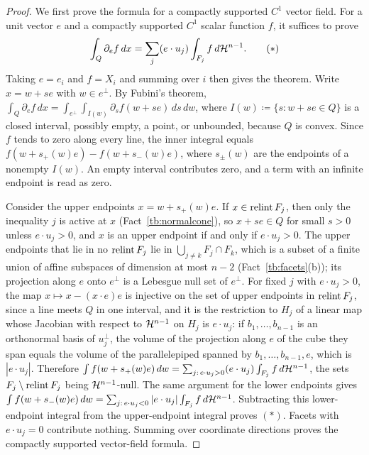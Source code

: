\documentclass[11pt,letterpaper]{article}
\theoremstyle{plain}
\begin{document}
\begin{proof}
We first prove the formula for a compactly supported \(C^1\) vector
field. For a unit vector \(e\) and a compactly supported
\(C^1\) scalar function \(f\), it suffices to prove
\begin{equation}
 \int_Q\partial_ef\,dx=\sum_j(e\cdot u_j)\int_{F_j}f\,d\mathcal H^{n-1}.
 \tag{\(*\)}
\end{equation}
Taking \(e=e_i\) and \(f=X_i\) and summing over \(i\) then gives the theorem. Write \(x=w+s e\) with \(w\in e^\perp\). By Fubini's theorem,
\(\int_Q\partial_ef\,dx=\int_{e^\perp}\int_{I(w)}\partial_sf(w+s e)\,ds\,dw\),
where \(I(w)\coloneqq \{s:w+s e\in Q\}\) is a closed interval, possibly empty, a point,
or unbounded, because \(Q\) is convex. Since \(f\) tends to zero along every
line, the inner integral equals \(f(w+s_+(w)e)-f(w+s_-(w)e)\), where
\(s_\pm(w)\) are the endpoints of a nonempty \(I(w)\).
An empty interval contributes zero, and a term with an infinite
endpoint is read as zero.

Consider the upper endpoints \(x=w+s_+(w)e\). If \(x\in\operatorname{relint} F_j\), then
only the inequality \(j\) is active at \(x\) (Fact~\ref{tb:normalcone}), so
\(x+s e\in Q\) for small \(s>0\) unless \(e\cdot u_j>0\), and \(x\) is an upper
endpoint if and only if \(e\cdot u_j>0\). The upper endpoints that lie in no
\(\operatorname{relint} F_j\) lie in \(\bigcup_{j\ne k}F_j\cap F_k\), which is a subset of a
finite union of affine subspaces of dimension at most \(n-2\)
(Fact~\ref{tb:facets}(b)); its projection along \(e\) onto \(e^\perp\) is a
Lebesgue null set of \(e^\perp\). For fixed \(j\) with \(e\cdot u_j>0\), the
map \(x\mapsto x-(x\cdot e)e\) is injective on the set of upper endpoints in
\(\operatorname{relint} F_j\), since a line meets \(Q\) in one interval, and it is the
restriction to \(H_j\) of a linear map whose Jacobian with respect to
\(\mathcal H^{n-1}\) on \(H_j\) is \(e\cdot u_j\): if \(b_1,\ldots,b_{n-1}\) is an
orthonormal basis of \(u_j^\perp\), the volume of the projection along \(e\)
of the cube they span equals the volume of the parallelepiped spanned by
\(b_1,\ldots,b_{n-1},e\), which is \(|e\cdot u_j|\). Therefore
\(\int f(w+s_+(w)e)\,dw=\sum_{j:\,e\cdot u_j>0}(e\cdot u_j)\int_{F_j}f\,d\mathcal H^{n-1}\),
the sets \(F_j\setminus\operatorname{relint} F_j\) being \(\mathcal H^{n-1}\)-null. The same
argument for the lower endpoints gives
\(\int f(w+s_-(w)e)\,dw
=\sum_{j:\,e\cdot u_j<0}|e\cdot u_j|\int_{F_j}f\,d\mathcal H^{n-1}\).
Subtracting this lower-endpoint integral from the upper-endpoint
integral proves \((*)\). Facets with \(e\cdot u_j=0\) contribute
nothing. Summing over coordinate directions proves the compactly
supported vector-field formula.


\end{proof}
\end{document}
